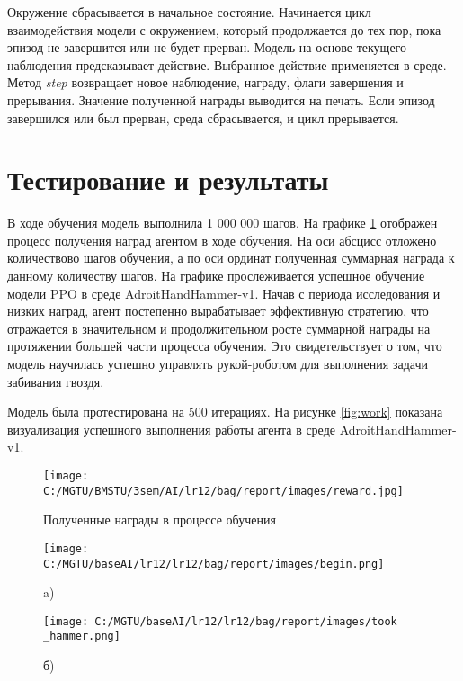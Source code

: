 Окружение сбрасывается в начальное состояние.
Начинается цикл взаимодействия модели с окружением, который продолжается до тех пор, 
пока эпизод не завершится или не будет прерван.
Модель на основе текущего наблюдения предсказывает действие. 
Выбранное действие применяется в среде. 
Метод \textit{step} возвращает новое наблюдение, награду, флаги завершения и прерывания.
Значение полученной награды выводится на печать.
Если эпизод завершился или был прерван, среда сбрасывается, и цикл прерывается.

\section{Тестирование и результаты}

В ходе обучения модель выполнила 1 000 000 шагов.
На графике \ref{fig:training_rewards} отображен процесс получения наград агентом в ходе обучения.
На оси абсцисс отложено количествово шагов обучения, а по оси ординат полученная суммарная награда к данному количеству шагов.
На графике прослеживается успешное обучение модели PPO в среде AdroitHandHammer-v1. 
Начав с периода исследования и низких наград, агент постепенно вырабатывает эффективную стратегию, 
что отражается в значительном и продолжительном росте суммарной награды на протяжении большей части процесса обучения. 
Это свидетельствует о том, что модель научилась успешно управлять рукой-роботом для выполнения задачи забивания гвоздя.

Модель была протестирована на 500 итерациях.
На рисунке \ref{fig:work} показана визуализация успешного выполнения работы агента в среде AdroitHandHammer-v1.

\begin{figure}[H]
    \centering
    \texttt{[image: C:/MGTU/BMSTU/3sem/AI/lr12/bag/report/images/reward.jpg]}
    \caption{Полученные награды в процессе обучения}
    \label{fig:training_rewards}
\end{figure}

\begin{figure}[H]
    \centering
    \begin{minipage}[H]{0.49\linewidth}
        \centering
        \texttt{[image: C:/MGTU/baseAI/lr12/lr12/bag/report/images/begin.png]}
        \caption*{a)}
    \end{minipage}
    \hfill
    \begin{minipage}[H]{0.48\linewidth}
        \centering
        \texttt{[image: C:/MGTU/baseAI/lr12/lr12/bag/report/images/took\\\_hammer.png]}
        \caption*{б)}
    \end{minipage}
\end{figure}

